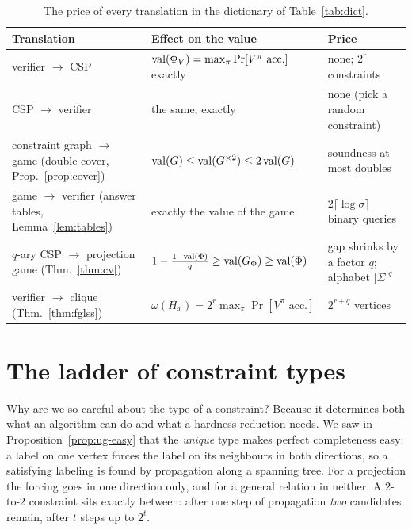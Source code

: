 \begin{table}[t]
\centering\small
\renewcommand{\arraystretch}{1.3}
\begin{tabular}{@{}>{\raggedright\arraybackslash}p{3.8cm}
                   >{\raggedright\arraybackslash}p{4.1cm}
                   >{\raggedright\arraybackslash}p{4.6cm}@{}}
\toprule
Translation & Effect on the value & Price\\
\midrule
verifier $\to$ CSP & $\operatorname{val}(\Phi_V)=\max_\pi\Pr[V^\pi\text{ acc.}]$ exactly & none; $2^r$ constraints\\
CSP $\to$ verifier & the same, exactly & none (pick a random constraint)\\
constraint graph $\to$ game (double cover, Prop.~\ref{prop:cover}) & $\operatorname{val}(G)\le\operatorname{val}(G^{\times2})\le2\operatorname{val}(G)$ & soundness at most doubles\\
game $\to$ verifier (answer tables, Lemma~\ref{lem:tables}) & exactly the value of the game & $2\lceil\log\sigma\rceil$ binary queries\\
$q$-ary CSP $\to$ projection game (Thm.~\ref{thm:cv}) & $1-\frac{1-\operatorname{val}(\Phi)}q\ge\operatorname{val}(G_\Phi)\ge\operatorname{val}(\Phi)$ & gap shrinks by a factor $q$; alphabet $|\Sigma|^q$\\
verifier $\to$ clique (Thm.~\ref{thm:fglss}) & $\omega(H_x)=2^r\max_\pi\Pr[V^\pi\text{ acc.}]$ & $2^{r+q}$ vertices\\
\bottomrule
\end{tabular}
\caption{The price of every translation in the dictionary of Table~\ref{tab:dict}.}
\label{tab:price}
\end{table}


\section{The ladder of constraint types}
\label{sec:ladder}

Why are we so careful about the type of a constraint?  Because it determines both what an algorithm can do and what a hardness reduction needs.
We saw in Proposition~\ref{prop:ug-easy} that the \emph{unique} type makes perfect completeness easy: a label on one vertex forces the label on its neighbours in both
directions, so a satisfying labeling is found by propagation along a spanning tree.  For a projection the forcing goes in one direction only, and for a general relation in neither.
A $2$-to-$2$ constraint sits exactly between: after one step of propagation \emph{two} candidates remain, after $t$ steps up to $2^t$.

